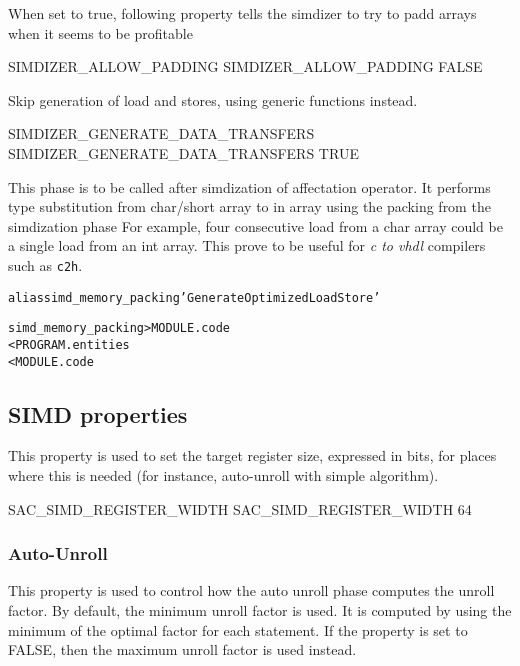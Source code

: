 \documentclass[a4paper]{report}
\newenvironment{PipsMake}{\begin{alltt}}{\end{alltt}}
\newenvironment{PipsPass}[1]{\label{pass:#1}}{}
\begin{document}
When set to true, following property tells the simdizer to try to padd arrays when it seems to be profitable
\begin{PipsProp}{SIMDIZER_ALLOW_PADDING}
SIMDIZER_ALLOW_PADDING FALSE
\end{PipsProp}

Skip generation of load and stores, using generic functions instead.
\begin{PipsProp}{SIMDIZER_GENERATE_DATA_TRANSFERS}
SIMDIZER_GENERATE_DATA_TRANSFERS TRUE
\end{PipsProp}

\begin{PipsPass}{simd_memory_packing}
This phase is to be called after simdization of affectation operator.
It performs type substitution from char/short array to in array
using the packing from the simdization phase
For example, four consecutive load from a char array could be a single load from an int array.
This prove to be useful for \textit{c to vhdl} compilers such as \texttt{c2h}.
\end{PipsPass}

\begin{PipsMake}
alias simd_memory_packing 'Generate Optimized Load Store'

simd_memory_packing  > MODULE.code
        < PROGRAM.entities
        < MODULE.code
\end{PipsMake}

\subsection{SIMD properties}

This property is used to set the target register size, expressed in
bits, for places where this is needed (for instance, auto-unroll with
simple algorithm).

\begin{PipsProp}{SAC_SIMD_REGISTER_WIDTH}
SAC_SIMD_REGISTER_WIDTH 64
\end{PipsProp}


\subsubsection{Auto-Unroll}

This property is used to control how the auto unroll phase computes
the unroll factor. By default, the minimum unroll factor is used. It
is computed by using the minimum of the optimal factor for each
statement. If the property is set to FALSE, then the maximum unroll
factor is used instead.
\end{document}
